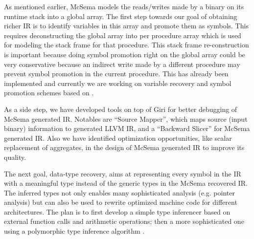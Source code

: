 \documentclass[10pt,twoside]{article}
\begin{document}
As mentioned earlier,  McSema models the reads/writes made by a binary on its
runtime stack into a global array.  The first step towards our goal of
obtaining richer IR is to identify variables in this array and promote them as
symbols. This requires deconstructing the global array into per
procedure array which is used for modeling the stack frame for that procedure.  This stack
frame re-construction is important because doing symbol promotion right on the
global array could be very conservative because an indirect write made by a
different procedure may prevent symbol promotion in the current procedure.
This has already been implemented and currently we are working on 
variable recovery and symbol promotion schemes based on
\cite{SECONDWRITE-EUROSYS-2013, DIVINE-VMCAI-2007}.

As a side step, we have developed tools \cite{SourceMapper} on top of
Giri\cite{GIRI-ASPLOS-2013} for better debugging of McSema generated IR.
Notables are ``Source Mapper'', which maps source (input binary) information
to generated LLVM IR, and a ``Backward Slicer'' for McSema generated IR. Also we
have identified optimization opportunities, like scalar replacement of
aggregates, in the design of McSema generated IR to improve its quality. 

The next goal, data-type recovery, aims at representing every symbol in the IR
with a meaningful type instead of the generic types in the McSema recovered IR.
The inferred types not only enables many sophisticated analysis (e.g. pointer
analysis) but can also be used to rewrite optimized machine code for different
architectures. The plan is to first develop a simple type inferencer based on
external function calls and arithmetic operations; then a more sophisticated
one using a polymorphic type inference algorithm
\cite{POLYTYPEINFERENCE-PLDI-2016}.

\nocite{*}

\end{document}
